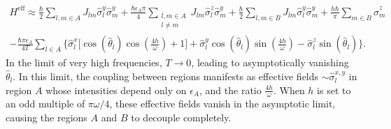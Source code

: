 \documentclass[
nofootinbib,
reprint,
superscriptaddress,
amsmath,amssymb,showkeys,
aps,
prb,
]{revtex4-2}
\begin{document}
	\begin{multline}
		H^{\mathrm{eff}} \approx\frac{\hbar}{2} \sum_{l,m\in A}J_{lm}\hat{\sigma}_l^y\hat{\sigma}_m^y +\frac{\hbar \epsilon_A \pi}{4} \sum_{\substack{l,m\in A\\l\neq m}} J_{lm}\hat{\sigma}^z_l\hat{\sigma}^y_m + \frac{\hbar}{2}\sum_{l,m\in B}J_{lm}\hat{\sigma}_l^y \hat{\sigma}_m^y + \frac{h\hbar}{\pi}\sum_{m \in B}\hat{\sigma}^z_m \\ -\frac{\hbar \pi \epsilon_A}{4T}\sum_{l\in A}\Bigg\{\hat{\sigma}^x_l \bigg[\cos(\hat{\theta}_l)\cos(\frac{4h}{\omega})+1 \bigg] + \hat{\sigma}^y_l \cos(\hat{\theta}_l)\sin(\frac{4h}{\omega})-\hat{\sigma}^z_l \sin(\hat{\theta}_l)\Bigg\}.
		\label{eq:app:nfloq_eff3}
	\end{multline}
	In the limit of very high frequencies, $T\rightarrow 0$, leading to asymptotically vanishing $\hat{\theta}_l$. In this limit, the coupling between regions manifests as effective fields $\sim \hat{\sigma}^{x,y}_l$ in region $A$ whose intensities depend only on $\epsilon_A$, and the ratio $\frac{4h}{\omega}$. When $h$ is set to an odd multiple of $\pi\omega/4$, these effective fields vanish in the asymptotic limit, causing the regions $A$ and $B$ to decouple completely.
\end{document}
